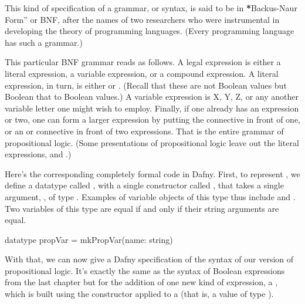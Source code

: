 \documentclass[letterpaper,10pt,english]{sphinxmanual}
\begin{document}
This kind of specification of a grammar, or syntax, is said to be in
{\color{red}\bfseries{}*}Backus-Naur Form” or BNF, after the names of two researchers who were
instrumental in developing the theory of programming languages. (Every
programming language has such a grammar.)

This particular BNF grammar reads as follows. A legal expression is
either a literal expression, a variable expression, or a compound
expression.  A literal expression, in turn, is either  or
. (Recall that these are not Boolean values but Boolean
 that  to Boolean values.)  A variable
expression is X, Y, Z, or any another variable letter one might wish
to employ. Finally, if one already has an expression or two, one can
form a larger expression by putting the  connective in front of
one, or an  or  connective in front of two expressions.  That
is the entire grammar of propositional logic. (Some presentations of
propositional logic leave out the literal expressions,  and
.)

Here’s the corresponding completely formal code in Dafny. First, to
represent , we define a datatype called , with a
single constructor called , that takes a single argument,
, of type .  Examples of variable objects of this type
thus include  and . Two variables of
this type are equal if and only if their string arguments are equal.

\begin{sphinxVerbatim}[commandchars=\\\{\}]
datatype propVar = mkPropVar(name: string)
\end{sphinxVerbatim}

With that, we can now give a Dafny specification of the syntax of our
version of propositional logic. It’s exactly the same as the syntax of
Boolean expressions from the last chapter but for the addition of one
new kind of expression, a , which is built using
the  constructor applied to a  (that is, a value of
type ).
\end{document}
